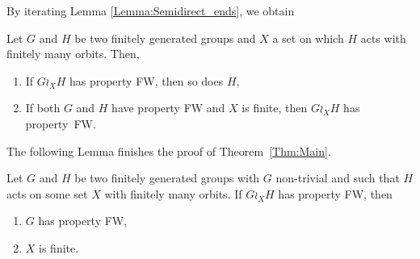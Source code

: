 %
%
By iterating Lemma \ref{Lemma:Semidirect_ends}, we obtain
%
%
\begin{cor}\label{Cor:Wreath_ends}
Let $G$ and $H$ be two finitely generated groups and $X$ a set on which $H$ acts with finitely many orbits. Then,
\begin{enumerate}
\item
If $G\wr_X H$ has property FW, then so does $H$,
\item
If both $G$ and $H$ have property FW and $X$ is finite, then $G\wr_X H$ has property~FW.
\end{enumerate}
\end{cor}
%
%
The following Lemma finishes the proof of Theorem~\ref{Thm:Main}.
%
%
\begin{lem}\label{Lem:Wreath_groups_ends}
Let $G$ and $H$ be two finitely generated groups with $G$ non-trivial and such that $H$ acts on some set $X$ with finitely many orbits.
If $G\wr_XH$ has property FW, then
\begin{enumerate}
\item $G$ has property FW,
\item $X$ is finite.
\end{enumerate}
\end{lem}
%
%
